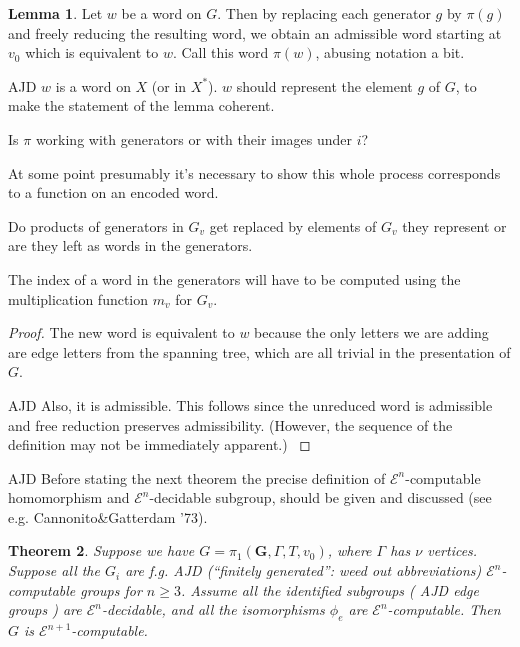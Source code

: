 \documentclass[a4paper]{article}
\newcommand{\grz}[1]{$\mathcal{E}^{#1}$}	%
\newcommand{\fgoagog}{\pi_1(\mathbf{G},\Gamma,T,v_0)}					%
\theoremstyle{plain}
\newtheorem{theorem}{Theorem}[section]
\theoremstyle{definition}
\newtheorem{lemma}[theorem]{Lemma}
\newenvironment{ad}{\noindent\color{green} AJD }{}
\newcommand{\ajd}[1]{
\begin{ad} #1 \end{ad}}
\begin{document}
\begin{lemma}
Let $w$ be a word on $G$. Then by replacing each generator $g$ by $\pi(g)$ and freely reducing the resulting word, we obtain an admissible word starting at $v_0$ which is equivalent to $w$. Call this word $\pi(w)$, abusing notation a bit.
\end{lemma}
\ajd{$w$ is a word on $X$ (or in $X^\ast$). $w$ should represent the
element $g$ of $G$, to make the statement of the lemma coherent.

Is $\pi$ working with generators or with their images under $i$? 

At some point presumably it's necessary to show this whole process
corresponds to a function on an encoded word.

Do
products of generators in $G_v$ get replaced by elements of $G_v$ they
represent or are they left as words in the generators. 

The index of a word
in the generators will have to be computed using the multiplication function
$m_v$ for $G_v$.}
\begin{proof}
The new word is equivalent to $w$ because the only letters we are adding are edge letters from the spanning tree, which are all trivial in the presentation of $G$.
\ajd{Also, it is admissible. This follows since the unreduced word is
admissible and free reduction preserves admissibility. (However, the 
sequence of the definition may not be immediately apparent.)}
\end{proof}

\ajd{Before stating the next theorem the precise definition of \grz{n}-computable
homomorphism and \grz{n}-decidable subgroup, 
should be given and discussed (see e.g.  Cannonito\&Gatterdam '73).}

\begin{theorem} \label{fgoagogcomp}
Suppose we have $G = \fgoagog$, where $\Gamma$ has $\nu$ vertices. Suppose 
all the $G_i$ are f.g. \ajd{(``finitely generated'': weed out abbreviations)} 
\grz{n}-computable groups for $n \geq 3$. Assume all the identified subgroups 
(\ajd{edge groups}) are \grz{n}-decidable, and all the isomorphisms $\phi_e$ 
are \grz{n}-computable. Then $G$ is \grz{n+1}-computable.
\end{theorem}
\end{document}
